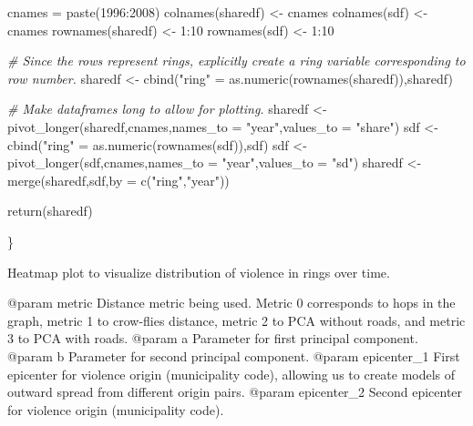 \documentclass[
]{article}
\newenvironment{Shaded}{\begin{snugshade}}{\end{snugshade}}
\newcommand{\AttributeTok}[1]{\textcolor[rgb]{0.77,0.63,0.00}{#1}}
\newcommand{\CommentTok}[1]{\textcolor[rgb]{0.56,0.35,0.01}{\textit{#1}}}
\newcommand{\DecValTok}[1]{\textcolor[rgb]{0.00,0.00,0.81}{#1}}
\newcommand{\FunctionTok}[1]{\textcolor[rgb]{0.00,0.00,0.00}{#1}}
\newcommand{\NormalTok}[1]{#1}
\newcommand{\OtherTok}[1]{\textcolor[rgb]{0.56,0.35,0.01}{#1}}
\newcommand{\SpecialCharTok}[1]{\textcolor[rgb]{0.00,0.00,0.00}{#1}}
\newcommand{\StringTok}[1]{\textcolor[rgb]{0.31,0.60,0.02}{#1}}
\begin{document}
\begin{Shaded}
\begin{Highlighting}[]
\NormalTok{cnames }\OtherTok{=} \FunctionTok{paste}\NormalTok{(}\DecValTok{1996}\SpecialCharTok{:}\DecValTok{2008}\NormalTok{)}
\FunctionTok{colnames}\NormalTok{(sharedf) }\OtherTok{\textless{}{-}}\NormalTok{ cnames}
\FunctionTok{colnames}\NormalTok{(sdf) }\OtherTok{\textless{}{-}}\NormalTok{ cnames}
\FunctionTok{rownames}\NormalTok{(sharedf) }\OtherTok{\textless{}{-}} \DecValTok{1}\SpecialCharTok{:}\DecValTok{10}
\FunctionTok{rownames}\NormalTok{(sdf) }\OtherTok{\textless{}{-}} \DecValTok{1}\SpecialCharTok{:}\DecValTok{10}

\CommentTok{\# Since the rows represent rings, explicitly create a ring variable corresponding to row number. }
\NormalTok{sharedf }\OtherTok{\textless{}{-}} \FunctionTok{cbind}\NormalTok{(}\StringTok{"ring"} \OtherTok{=} \FunctionTok{as.numeric}\NormalTok{(}\FunctionTok{rownames}\NormalTok{(sharedf)),sharedf)}

\CommentTok{\# Make dataframes long to allow for plotting. }
\NormalTok{sharedf }\OtherTok{\textless{}{-}} \FunctionTok{pivot\_longer}\NormalTok{(sharedf,cnames,}\AttributeTok{names\_to =} \StringTok{"year"}\NormalTok{,}\AttributeTok{values\_to =} \StringTok{"share"}\NormalTok{)}
\NormalTok{sdf }\OtherTok{\textless{}{-}} \FunctionTok{cbind}\NormalTok{(}\StringTok{"ring"} \OtherTok{=} \FunctionTok{as.numeric}\NormalTok{(}\FunctionTok{rownames}\NormalTok{(sdf)),sdf)}
\NormalTok{sdf }\OtherTok{\textless{}{-}} \FunctionTok{pivot\_longer}\NormalTok{(sdf,cnames,}\AttributeTok{names\_to =} \StringTok{"year"}\NormalTok{,}\AttributeTok{values\_to =} \StringTok{"sd"}\NormalTok{)}
\NormalTok{sharedf }\OtherTok{\textless{}{-}} \FunctionTok{merge}\NormalTok{(sharedf,sdf,}\AttributeTok{by =} \FunctionTok{c}\NormalTok{(}\StringTok{"ring"}\NormalTok{,}\StringTok{"year"}\NormalTok{))}

\FunctionTok{return}\NormalTok{(sharedf)}

\NormalTok{\}  }
\end{Highlighting}
\end{Shaded}

Heatmap plot to visualize distribution of violence in rings over time.

@param metric Distance metric being used. Metric 0 corresponds to hops
in the graph, metric 1 to crow-flies distance, metric 2 to PCA without
roads, and metric 3 to PCA with roads. @param a Parameter for first
principal component. @param b Parameter for second principal component.
@param epicenter\_1 First epicenter for violence origin (municipality
code), allowing us to create models of outward spread from different
origin pairs. @param epicenter\_2 Second epicenter for violence origin
(municipality code).
\end{document}
